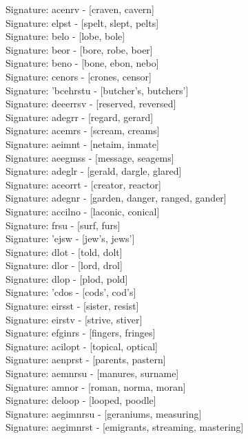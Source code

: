 Signature: {acenrv} - [craven, cavern] \\
Signature: {elpst} - [spelt, slept, pelts] \\
Signature: {belo} - [lobe, bole] \\
Signature: {beor} - [bore, robe, boer] \\
Signature: {beno} - [bone, ebon, nebo] \\
Signature: {cenors} - [crones, censor] \\
Signature: {'bcehrstu} - [butcher's, butchers'] \\
Signature: {deeerrsv} - [reserved, reversed] \\
Signature: {adegrr} - [regard, gerard] \\
Signature: {acemrs} - [scream, creams] \\
Signature: {aeimnt} - [netaim, inmate] \\
Signature: {aeegmss} - [message, seagems] \\
Signature: {adeglr} - [gerald, dargle, glared] \\
Signature: {aceorrt} - [creator, reactor] \\
Signature: {adegnr} - [garden, danger, ranged, gander] \\
Signature: {accilno} - [laconic, conical] \\
Signature: {frsu} - [surf, furs] \\
Signature: {'ejsw} - [jew's, jews'] \\
Signature: {dlot} - [told, dolt] \\
Signature: {dlor} - [lord, drol] \\
Signature: {dlop} - [plod, pold] \\
Signature: {'cdos} - [cods', cod's] \\
Signature: {eirsst} - [sister, resist] \\
Signature: {eirstv} - [strive, stiver] \\
Signature: {efginrs} - [fingers, fringes] \\
Signature: {acilopt} - [topical, optical] \\
Signature: {aenprst} - [parents, pastern] \\
Signature: {aemnrsu} - [manures, surname] \\
Signature: {amnor} - [roman, norma, moran] \\
Signature: {deloop} - [looped, poodle] \\
Signature: {aegimnrsu} - [geraniums, measuring] \\
Signature: {aegimnrst} - [emigrants, streaming, mastering] \\
